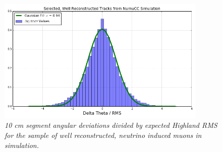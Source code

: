 \begin{figure}[ht!]
\begin{center}
\includegraphics[width=100mm]{Figures/Highland_validation_MCBNBSelectedRecoTrack.png}
\end{center}
\caption{\textit{10 cm segment angular deviations divided by expected Highland RMS for the sample of well reconstructed, neutrino induced muons in simulation.}}
\label{Highland_validation_MCBNBSelectedRecoTracks_fig}
\end{figure}
